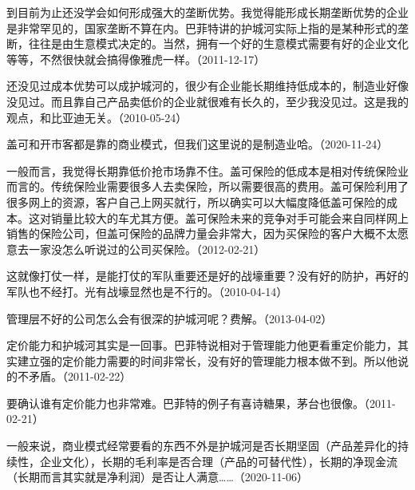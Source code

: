 
到目前为止还没学会如何形成强大的垄断优势。我觉得能形成长期垄断优势的企业是非常罕见的，国家垄断不算在内。巴菲特讲的护城河实际上指的是某种形式的垄断，往往是由生意模式决定的。当然，拥有一个好的生意模式需要有好的企业文化等等，不然很快就会搞得像雅虎一样。（2011-12-17）


还没见过成本优势可以成护城河的，很少有企业能长期维持低成本的，制造业好像没见过。而且靠自己产品卖低价的企业就很难有长久的，至少我没见过。这是我的观点，和比亚迪无关。（2010-05-24）


盖可和开市客都是靠的商业模式，但我们这里说的是制造业哈。（2020-11-24）

一般而言，我觉得长期靠低价抢市场靠不住。盖可保险的低成本是相对传统保险业而言的。传统保险业需要很多人去卖保险，所以需要很高的费用。盖可保险利用了很多网上的资源，客户自己上网买就行，所以确实可以大幅度降低盖可保险的成本。这对销量比较大的车尤其方便。盖可保险未来的竞争对手可能会来自同样网上销售的保险公司，但盖可保险的品牌力量会非常大，因为买保险的客户大概不太愿意去一家没怎么听说过的公司买保险。（2012-02-21）


这就像打仗一样，是能打仗的军队重要还是好的战壕重要？没有好的防护，再好的军队也不经打。光有战壕显然也是不行的。（2010-04-14）


管理层不好的公司怎么会有很深的护城河呢？费解。（2013-04-02）

定价能力和护城河其实是一回事。巴菲特说相对于管理能力他更看重定价能力，其实建立强的定价能力需要的时间非常长，没有好的管理能力根本做不到。所以他说的不矛盾。（2011-02-22）

要确认谁有定价能力也非常难。巴菲特的例子有喜诗糖果，茅台也很像。（2011-02-21）


一般来说，商业模式经常要看的东西不外是护城河是否长期坚固（产品差异化的持续性，企业文化），长期的毛利率是否合理（产品的可替代性），长期的净现金流（长期而言其实就是净利润）是否让人满意……（2020-11-06）



